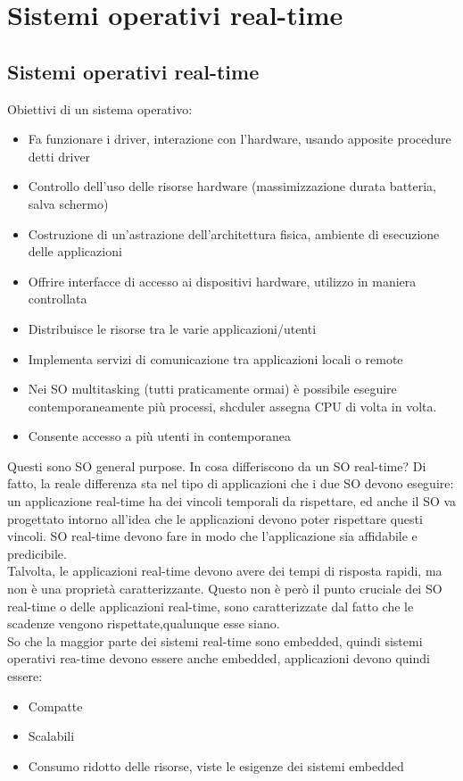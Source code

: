 \documentclass[12pt, oneside]{extbook}
\begin{document}
\chapter{Sistemi operativi real-time}
\section{Sistemi operativi real-time}
Obiettivi di un sistema operativo:
\begin{itemize}
\item Fa funzionare i driver, interazione con l'hardware, usando apposite procedure detti driver
\item Controllo dell'uso delle risorse hardware (massimizzazione durata batteria, salva schermo)
\item Costruzione di un'astrazione dell'architettura fisica, ambiente di esecuzione delle applicazioni
\item Offrire interfacce di accesso ai dispositivi hardware, utilizzo in maniera controllata
\item Distribuisce le risorse tra le varie applicazioni/utenti
\item Implementa servizi di comunicazione tra applicazioni locali o remote
\item Nei SO multitasking (tutti praticamente ormai) è possibile eseguire contemporaneamente più processi, shcduler assegna CPU di volta 
in volta.
\item Consente accesso a più utenti in contemporanea
\end{itemize}
Questi sono SO general purpose. In cosa differiscono da un SO real-time? Di fatto, la reale differenza sta nel tipo di applicazioni che i due SO devono eseguire: un applicazione real-time ha dei vincoli temporali da rispettare, ed anche il SO va progettato intorno all'idea che le applicazioni devono poter rispettare questi vincoli. SO real-time devono fare in modo che l'applicazione sia affidabile e predicibile.\\ Talvolta, le applicazioni real-time devono avere dei tempi di risposta rapidi, ma non è una proprietà caratterizzante. Questo non è però il punto cruciale dei SO real-time o delle applicazioni real-time, sono caratterizzate dal fatto che le scadenze vengono rispettate,qualunque esse siano.\\ So che la maggior parte dei sistemi real-time sono embedded, quindi sistemi operativi rea-time devono essere anche embedded, applicazioni devono quindi essere:
\begin{itemize}
\item Compatte
\item Scalabili
\item Consumo ridotto delle risorse, viste le esigenze dei sistemi embedded
\end{itemize}
\end{document}
